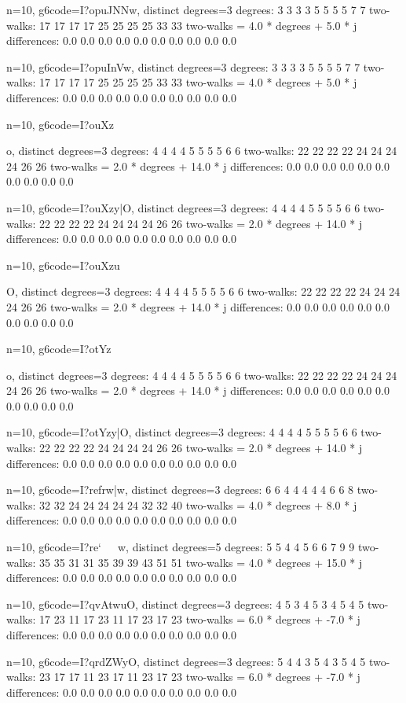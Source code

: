 {{{{{{{{{{{{{{{n=10, g6code=I?opuJNNw, distinct degrees=3
degrees: 3 3 3 3 5 5 5 5 7 7 
two-walks: 17 17 17 17 25 25 25 25 33 33 
two-walks = 4.0 * degrees + 5.0 * j
differences: 0.0 0.0 0.0 0.0 0.0 0.0 0.0 0.0 0.0 0.0 

n=10, g6code=I?opuInVw, distinct degrees=3
degrees: 3 3 3 3 5 5 5 5 7 7 
two-walks: 17 17 17 17 25 25 25 25 33 33 
two-walks = 4.0 * degrees + 5.0 * j
differences: 0.0 0.0 0.0 0.0 0.0 0.0 0.0 0.0 0.0 0.0 

n=10, g6code=I?ouXz{{o, distinct degrees=3
degrees: 4 4 4 4 5 5 5 5 6 6 
two-walks: 22 22 22 22 24 24 24 24 26 26 
two-walks = 2.0 * degrees + 14.0 * j
differences: 0.0 0.0 0.0 0.0 0.0 0.0 0.0 0.0 0.0 0.0 

n=10, g6code=I?ouXzy|O, distinct degrees=3
degrees: 4 4 4 4 5 5 5 5 6 6 
two-walks: 22 22 22 22 24 24 24 24 26 26 
two-walks = 2.0 * degrees + 14.0 * j
differences: 0.0 0.0 0.0 0.0 0.0 0.0 0.0 0.0 0.0 0.0 

n=10, g6code=I?ouXzu}O, distinct degrees=3
degrees: 4 4 4 4 5 5 5 5 6 6 
two-walks: 22 22 22 22 24 24 24 24 26 26 
two-walks = 2.0 * degrees + 14.0 * j
differences: 0.0 0.0 0.0 0.0 0.0 0.0 0.0 0.0 0.0 0.0 

n=10, g6code=I?otYz{{o, distinct degrees=3
degrees: 4 4 4 4 5 5 5 5 6 6 
two-walks: 22 22 22 22 24 24 24 24 26 26 
two-walks = 2.0 * degrees + 14.0 * j
differences: 0.0 0.0 0.0 0.0 0.0 0.0 0.0 0.0 0.0 0.0 

n=10, g6code=I?otYzy|O, distinct degrees=3
degrees: 4 4 4 4 5 5 5 5 6 6 
two-walks: 22 22 22 22 24 24 24 24 26 26 
two-walks = 2.0 * degrees + 14.0 * j
differences: 0.0 0.0 0.0 0.0 0.0 0.0 0.0 0.0 0.0 0.0 

n=10, g6code=I?refrw|w, distinct degrees=3
degrees: 6 6 4 4 4 4 4 6 6 8 
two-walks: 32 32 24 24 24 24 24 32 32 40 
two-walks = 4.0 * degrees + 8.0 * j
differences: 0.0 0.0 0.0 0.0 0.0 0.0 0.0 0.0 0.0 0.0 

n=10, g6code=I?re`~~~w, distinct degrees=5
degrees: 5 5 4 4 5 6 6 7 9 9 
two-walks: 35 35 31 31 35 39 39 43 51 51 
two-walks = 4.0 * degrees + 15.0 * j
differences: 0.0 0.0 0.0 0.0 0.0 0.0 0.0 0.0 0.0 0.0 

n=10, g6code=I?qvAtwuO, distinct degrees=3
degrees: 4 5 3 4 5 3 4 5 4 5 
two-walks: 17 23 11 17 23 11 17 23 17 23 
two-walks = 6.0 * degrees + -7.0 * j
differences: 0.0 0.0 0.0 0.0 0.0 0.0 0.0 0.0 0.0 0.0 

n=10, g6code=I?qrdZWyO, distinct degrees=3
degrees: 5 4 4 3 5 4 3 5 4 5 
two-walks: 23 17 17 11 23 17 11 23 17 23 
two-walks = 6.0 * degrees + -7.0 * j
differences: 0.0 0.0 0.0 0.0 0.0 0.0 0.0 0.0 0.0 0.0 

}}}}}}}}}}}}}}}}}}
